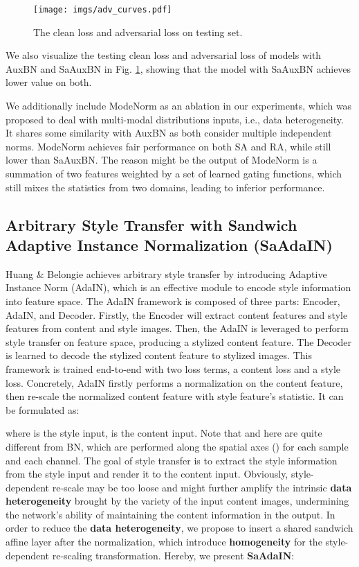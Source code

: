 \documentclass{article}
\begin{document}
\begin{figure}[t!]
\begin{center}
 \texttt{[image: imgs/adv\_curves.pdf]}
\end{center}
\vspace{-8pt}
  \caption{The clean loss  and adversarial loss  on testing set.}
\label{fig:robustness_loss}
\end{figure}
We also visualize the testing clean loss and adversarial loss of models with AuxBN and SaAuxBN in Fig. \ref{fig:robustness_loss}, showing that the model with SaAuxBN achieves lower value on both.


We additionally include ModeNorm \citep{deecke2018mode} as an ablation in our experiments, which was proposed to deal with multi-modal distributions inputs, i.e., data heterogeneity. It shares some similarity with AuxBN as both consider multiple independent norms. ModeNorm achieves fair performance on both SA and RA, while still lower than SaAuxBN. The reason might be the output of ModeNorm is a summation of two features weighted by a set of learned gating functions, which still mixes the statistics from two domains, leading to inferior performance. 

 \vspace{-5pt}
\subsection{Arbitrary Style Transfer with Sandwich Adaptive Instance Normalization (SaAdaIN)}
Huang \& Belongie \citep{huang2017arbitrary} achieves arbitrary style transfer by introducing Adaptive Instance Norm (AdaIN), which is an effective module to encode style information into feature space.  The AdaIN framework is composed of three parts: Encoder, AdaIN, and Decoder. Firstly, the Encoder will extract content features and style features from content and style images. Then, the AdaIN is leveraged to perform style transfer on feature space, producing a stylized content feature. The Decoder is learned to decode the stylized content feature to stylized images. This framework is trained end-to-end with two loss terms, a content loss and a style loss. Concretely, AdaIN firstly performs a normalization on the content feature, then re-scale the normalized content feature with style feature's statistic. It can be formulated as:
 
where  is the style input,  is the content input. Note that  and  here are quite different from BN, which are performed along the spatial axes () for each sample and each channel. The goal of style transfer is to extract the style information from the style input and render it to the content input. Obviously, style-dependent re-scale may be too loose and might further amplify the intrinsic \textbf{data heterogeneity} brought by the variety of the input content images, undermining the network's ability of maintaining the content information in the output. In order to reduce the \textbf{data heterogeneity}, we propose to insert a shared sandwich affine layer after the normalization, which introduce \textbf{homogeneity} for the style-dependent re-scaling transformation. Hereby, we present \textbf{SaAdaIN}:
\end{document}
